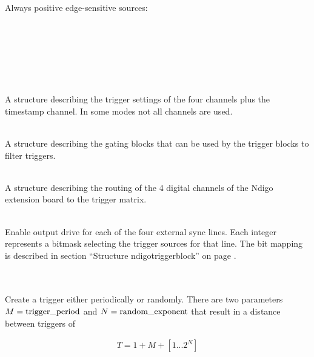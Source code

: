 			Always positive edge-sensitive sources:\\
			\\
			\\
			\\
			\\
			\\
			\par

			\\
			A structure describing the trigger settings of the four channels plus the timestamp channel. In some modes not all channels are used.\par

			\\
			A structure describing the gating blocks that can be used by the trigger blocks to filter triggers.\par

			\\
			A structure describing the routing of the 4 digital channels of the Ndigo extension board to the trigger matrix.\par

			\\
			Enable output drive for each of the four external sync lines. Each integer represents a bitmask selecting the trigger sources for that line. The bit mapping is described in section ``Structure \textsf{ndigo\tu trigger\tu block}'' on page \pageref{cp:triggerblock}.\par

			\\
			\\
			Create a trigger either periodically or randomly. There are two parameters $M = \text{trigger\textunderscore period}$ and $N = \text{random\textunderscore exponent}$ that result in a distance between triggers of
			
			\begin{align}
				T = 1 + M + [1...2^N]
			\end{align}


